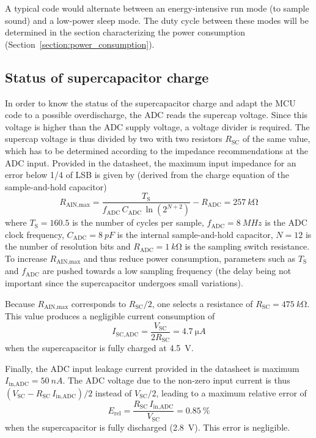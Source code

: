 \documentclass{EPL-master-thesis-covers-EN}
\newcommand{\te}[1]{\textrm{#1}}
\begin{document}
A typical code would alternate between an energy-intensive run mode (to sample sound) and a low-power sleep mode. The duty cycle between these modes will be determined in the section characterizing the power consumption (Section~\ref{section:power_consumption}).

\subsection*{Status of supercapacitor charge}

In order to know the status of the supercapacitor charge and adapt the MCU code to a possible overdischarge, the ADC reads the supercap voltage. Since this voltage is higher than the ADC supply voltage, a voltage divider is required. The supercap voltage is thus divided by two with two resistors $R_\te{SC}$ of the same value, which has to be determined according to the impedance recommendations at the ADC input. Provided in the datasheet, the maximum input impedance for an error below 1/4 of LSB is given by (derived from the charge equation of the sample-and-hold capacitor)
\[
 R_\te{AIN,max} = \frac{T_\te{S}}{f_\te{ADC}\,C_\te{ADC}\,\ln(2^{N+2})} - R_\te{ADC} = \SI{257}{k\ohm}
\]
where $T_\te{S} = 160.5$ is the number of cycles per sample, $f_\te{ADC} = \SI{8}{MHz}$ is the ADC clock frequency, $C_\te{ADC} = \SI{8}{pF}$ is the internal sample-and-hold capacitor, $N=12$ is the number of resolution bits and $R_\te{ADC} = \SI{1}{k\ohm}$ is the sampling switch resistance. To increase $R_\te{AIN,max}$ and thus reduce power consumption, parameters such as $T_\te{S}$ and $f_\te{ADC}$ are pushed towards a low sampling frequency (the delay being not important since the supercapacitor undergoes small variations).

Because $R_\te{AIN,max}$ corresponds to $R_\te{SC}/2$, one selects a resistance of $R_\te{SC} = \SI{475}{k\ohm}$. This value produces a negligible current consumption of
\[
 I_\te{SC,ADC} = \frac{V_\te{SC}}{2R_\te{SC}} = \SI{4.7}{\micro A}
\]
when the supercapacitor is fully charged at \SI{4.5}{V}.

Finally, the ADC input leakage current provided in the datasheet is maximum $I_\te{in,ADC} = \SI{50}{nA}$. The ADC voltage due to the non-zero input current is thus $(V_\te{SC} - R_\te{SC}\,I_\te{in,ADC})/2$ instead of $V_\te{SC}/2$, leading to a maximum relative error of
\[
 E_\te{rel} = \frac{R_\te{SC}\,I_\te{in,ADC}}{V_\te{SC}} = \SI{0.85}{\%}
\]
when the supercapacitor is fully discharged (\SI{2.8}{V}). This error is negligible.
\end{document}
